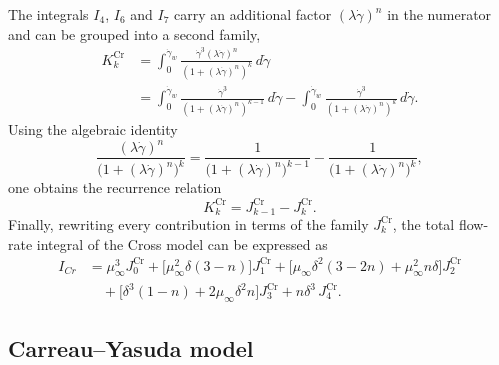 \documentclass[lineno]{jfm}
\begin{document}
The integrals $I_4$, $I_6$ and $I_7$ carry an additional factor
$(\lambda\dot\gamma)^n$ in the numerator and can be grouped into a second family,
\begin{align}
K_k^{\mathrm{Cr}}
&= \int_0^{\dot{\gamma}_w}
   \frac{\dot{\gamma}^3 (\lambda \dot{\gamma})^n}{(1+(\lambda \dot{\gamma})^n)^k}
   \, d\dot{\gamma} \nonumber\\
&= \int_0^{\dot{\gamma}_w}
   \frac{\dot{\gamma}^3}{(1+(\lambda \dot{\gamma})^n)^{k-1}} \, d\dot{\gamma}
 - \int_0^{\dot{\gamma}_w}
   \frac{\dot{\gamma}^3}{(1+(\lambda \dot{\gamma})^n)^k} \, d\dot{\gamma}.
\end{align}
Using the algebraic identity
\[
\frac{(\lambda \dot{\gamma})^n}{\bigl(1+(\lambda \dot{\gamma})^n\bigr)^k}
= \frac{1}{\bigl(1+(\lambda \dot{\gamma})^n\bigr)^{k-1}}
- \frac{1}{\bigl(1+(\lambda \dot{\gamma})^n\bigr)^k},
\]
one obtains the recurrence relation
\begin{equation}
K_k^{\mathrm{Cr}} = J_{k-1}^{\mathrm{Cr}} - J_k^{\mathrm{Cr}}.
\end{equation}
Finally, rewriting every contribution in terms of the family $J_k^{\mathrm{Cr}}$,
the total flow-rate integral of the Cross model can be expressed as
\begin{align}
I_{Cr} &= \mu_{\infty}^3 J_0^{\mathrm{Cr}}
        + \bigl[\mu_{\infty}^2 \delta (3 - n)\bigr] J_1^{\mathrm{Cr}}
        + \bigl[\mu_{\infty} \delta^2 (3 - 2n) + \mu_{\infty}^2 n \delta\bigr]
          J_2^{\mathrm{Cr}} \nonumber\\
       &\quad + \bigl[\delta^3 (1 - n) + 2\mu_{\infty} \delta^2 n\bigr]
          J_3^{\mathrm{Cr}} + n \delta^3 \, J_4^{\mathrm{Cr}}.
\end{align}

\subsection{Carreau--Yasuda model}
\end{document}
